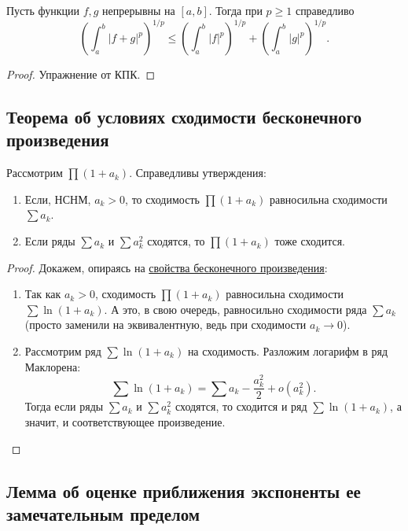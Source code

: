 \begin{ntheorem}
	Пусть функции \(f, g\) непрерывны на \([a, b]\). Тогда при \(p \geqslant 1\) справедливо \[
	\left(\int_a^b |f + g|^p \right)^{1/p} \leqslant \left(\int_a^b |f|^p \right)^{1/p} + \left(\int_a^b |g|^p \right)^{1/p}.
	\]
\end{ntheorem}
\begin{proof}
	Упражнение от КПК.
\end{proof}

\subsection{Теорема об условиях сходимости бесконечного произведения}

\begin{theorem}
	Рассмотрим \(\prod (1 + a_k)\). Справедливы утверждения:
	\begin{enumerate}
		\item Если, НСНМ, \(a_k > 0\), то сходимость \(\prod (1 + a_k)\) равносильна сходимости \(\sum a_k\).
		\item Если ряды \(\sum a_k\) и \(\sum a_k^2\) сходятся, то \(\prod (1 + a_k)\) тоже сходится.
	\end{enumerate}
\end{theorem}
\begin{proof}
	Докажем, опираясь на \hyperlink{besk}{свойства бесконечного произведения}:
	\begin{enumerate}
		\item Так как \(a_k > 0\), сходимость \(\prod (1 + a_k)\) равносильна сходимости \(\sum \ln (1 + a_k)\). А это, в свою очередь, равносильно сходимости ряда \(\sum a_k\) (просто заменили на эквивалентную, ведь при сходимости \(a_k \to 0\)).
		\item Рассмотрим ряд \(\sum \ln (1 + a_k)\) на сходимость. Разложим логарифм в ряд Маклорена: \[
			\sum \ln (1 + a_k) = \sum a_k - \dfrac{a_k^2}{2} + o(a_k^2).
		\]
		Тогда если ряды \(\sum a_k\) и \(\sum a_k^2\) сходятся, то сходится и ряд \(\sum \ln (1 + a_k)\), а значит, и соответствующее произведение.
	\end{enumerate}
\end{proof}

\subsection{Лемма об оценке приближения экспоненты ее замечательным пределом}

